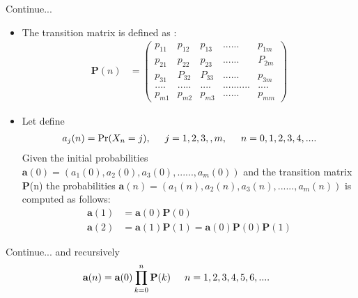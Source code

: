 \documentclass{beamer}
\begin{document}
\begin{frame}
   \begin{block}{Continue...}
   \begin{itemize}
      \item The transition matrix is defined as :
    \begin{align}
        \textbf{P}(n)&=\begin{pmatrix}
                       p_{11} & p_{12} & p_{13} & ......& p_{1m} \\
                       p_{21} & p_{22} & p_{23} & ......& P_{2m}\\
                       p_{31} & P_{32} & P_{33} & ......& p_{3m}\\
                       ....&.....&....&..........&....\\
                       p_{m1} & p_{m2} & p_{m3} & ......& p_{mm}
                       \end{pmatrix} \nonumber
    \end{align}
    \item Let define
    \begin{align}
        a_{j}(n)=\Pr(X_n=j),\hspace{0.5cm} j=1,2,3,,m,\hspace{0.5cm} n=0,1,2,3,4,.... \nonumber
    \end{align}
    Given the initial probabilities  \(\textbf{a}(0)=(a_{1}(0),a_{2}(0),a_{3}(0),......,a_{m}(0))\) and the transition matrix \textbf{P}(n) the probabilities  \(\textbf{a}(n)=(a_{1}(n),a_{2}(n),a_{3}(n),......,a_{m}(n))\) is computed as follows:
    \begin{align}
    \textbf{a}(1)&=\textbf{a}(0)\textbf{P}(0) \nonumber \\
    \textbf{a}(2)&=\textbf{a}(1)\textbf{P}(1)=\textbf{a}(0)\textbf{P}(0)\textbf{P}(1) \nonumber
    \end{align}
    \end{itemize}
   \end{block}
    
\end{frame}
\begin{frame}
  \begin{block}{Continue...}
  and recursively
  \begin{align}
      \textbf{a}(n)&=\textbf{a}(0)\prod_{k=0}^n\textbf{P}(k) \hspace{0.5cm} n=1,2,3,4,5,6,....\nonumber
  \end{align}
    
  \end{block}
    
\end{frame}
\end{document}
